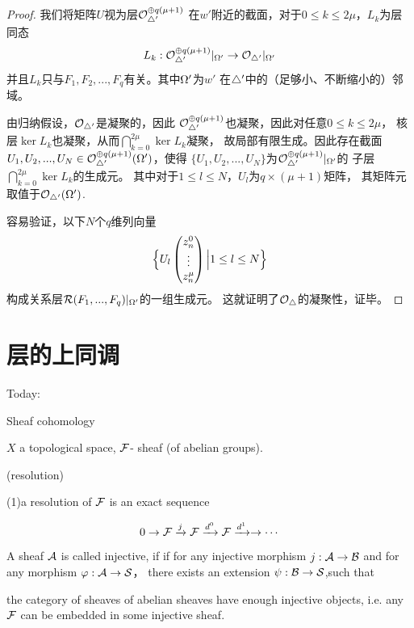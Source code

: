 \begin{proof}
我们将矩阵$U$视为层$\mathcal{O}_{\triangle'}^{\oplus q(\mu+1)}$
在$w'$附近的截面，对于$0\leq k\leq2\mu$，$L_k$为层同态
$$
  L_k:\mathcal{O}_{\triangle'}^{\oplus q(\mu+1)}|_{\Omega'}
\to
  \mathcal{O}_{\triangle'}|_{\Omega'}
$$
并且$L_k$只与$F_1,F_2,...,F_q$有关。其中$\Omega'$为$w'$
在$\triangle'$中的（足够小、不断缩小的）邻域。\vs

由归纳假设，$\mathcal{O}_{\triangle'}$是凝聚的，因此
$\mathcal{O}_{\triangle'}^{\oplus q(\mu+1)}$也凝聚，因此对任意$0\leq k\leq 2\mu$，
核层$\ker L_k$也凝聚，从而$\bigcap\limits_{k=0}^{2\mu}\ker L_k$凝聚，
故局部有限生成。因此存在截面
$U_1,U_2,...,U_N\in\mathcal{O}_{\triangle'}^{\oplus q(\mu+1)}(\Omega')$，使得
$\{U_1,U_2,...,U_N\}$为$\mathcal{O}_{\triangle'}^{\oplus q(\mu+1)}|_{\Omega'}$的
子层$\bigcap\limits_{k=0}^{2\mu}\ker L_k$的生成元。
其中对于$1\leq l\leq N$，$U_l$为$q\times(\mu+1)$矩阵，
其矩阵元取值于$\mathcal{O}_{\triangle'}(\Omega')$.

容易验证，以下$N$个$q$维列向量
$$
  \Big\{ U_l
           \begin{pmatrix}
             z_n^0  \\
             \vdots \\
             z_n^\mu
           \end{pmatrix}
          \Big| 1\leq l\leq N \Big\}
$$
构成关系层$\mathcal{R}(F_1,...,F_q)|_{\Omega'}$的一组生成元。
这就证明了$\mathcal{O}_{\triangle}$的凝聚性，证毕。
\end{proof}


\section{层的上同调}
Today:

Sheaf cohomology

$X$ a topological space, $\mathcal{F}$- sheaf (of abelian groups).

\begin{definition}  (resolution)

(1)a resolution of $\mathcal{F}$ is an exact sequence

$$0\to \mathcal{F}\xrightarrow{j}\mathcal{F}\xrightarrow{d^0}\mathcal{F}\xrightarrow{d^1}\to\cdots$$

\end{definition}

\begin{definition}
A sheaf $\mathcal{A}$ is called injective, if
if for any injective morphism $j:\mathcal{A}\to \mathcal{B}$
and for any morphism $\varphi:\mathcal{A}\to\mathcal{S}$，
there exists an extension $\psi :\mathcal{B}\to \mathcal{S}$,such that
\end{definition}
\begin{thm}
the category of sheaves of abelian sheaves have enough
injective objects, i.e.  any $\mathcal{F}$ can be
embedded in some injective sheaf.
\end{thm}

